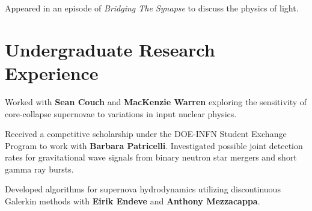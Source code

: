 \documentclass[letterpaper]{deedy-resume} %
\begin{document}
\sectionspace %

Appeared in an episode of \textit{Bridging The Synapse} to discuss the physics of light.



\section{Undergraduate Research Experience}


Worked with \textbf{Sean Couch} and \textbf{MacKenzie Warren}
exploring the sensitivity of core-collapse supernovae to variations in input nuclear physics.

\sectionspace %



Received a competitive scholarship under the DOE-INFN Student Exchange Program to work with \textbf{Barbara Patricelli}. Investigated possible joint detection rates for gravitational wave signals from binary neutron star mergers and short gamma ray bursts.

\sectionspace %



Developed algorithms for supernova hydrodynamics utilizing discontinuous Galerkin methods with \textbf{Eirik Endeve} and \textbf{Anthony Mezzacappa}.

\sectionspace %

\end{document}

